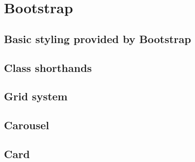 \chapter{Bootstrap}

\section{Basic styling provided by Bootstrap}

\section{Class shorthands}

\section{Grid system}

\section{Carousel}

\section{Card}
